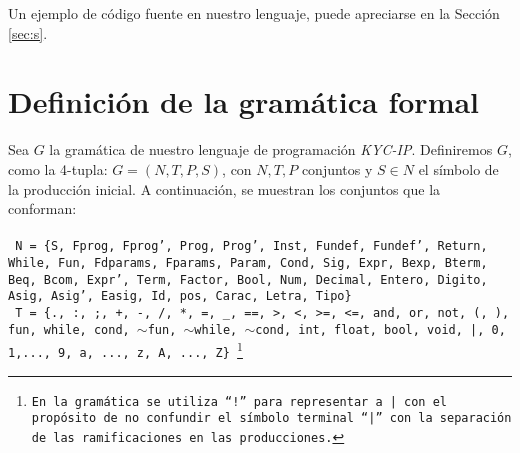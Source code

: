 \documentclass[12pt]{article}
\begin{document}
Un ejemplo de código fuente en nuestro lenguaje, puede apreciarse en la Sección \ref{sec:s}.
\section{Definición de la gramática formal}

Sea $G$ la gramática de nuestro lenguaje de programación \textit{KYC-IP}. Definiremos $G$, como la 4-tupla: $G = (N,T,P,S)$, con $N,T,P$ conjuntos y $S \in N$ el símbolo de la producción inicial.
A continuación, se muestran los conjuntos que la conforman:\\ \\
\texttt{ 
N = \{S, Fprog, Fprog', Prog, Prog', Inst, Fundef, Fundef', Return, While, Fun, Fdparams, Fparams, Param, Cond, Sig, Expr, Bexp, Bterm, Beq, Bcom, Expr', Term, Factor, Bool, Num, Decimal, Entero, Digito, Asig, Asig', Easig, Id, pos, Carac, Letra, Tipo\}
}\\

\texttt{
T = \{., :, ;, +, -, /, *, =, \_, ==, >, <, >=, <=, and, or, not, (, ), fun, while, cond, $\sim$fun, $\sim$while, $\sim$cond, int, float, bool, void, |, 0, 1,..., 9, a, ..., z, A, ..., Z\}  \footnote{En la gramática se utiliza ``!'' para representar a | con el propósito de no confundir el símbolo terminal ``|'' con la separación de las ramificaciones en las producciones.}
}\\
\end{document}

